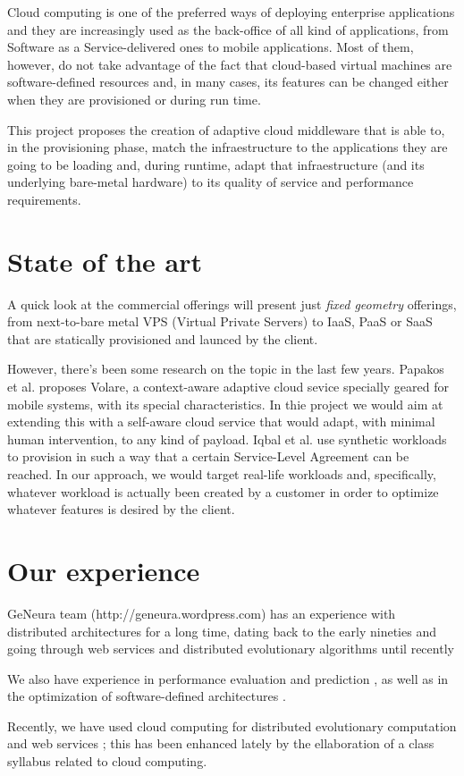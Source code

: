 \documentclass[a4paper]{article}
\begin{document}
Cloud computing is one of the preferred ways of deploying enterprise
applications and they are increasingly used as the back-office of all
kind of applications, from Software as a Service-delivered ones to
mobile applications. Most of them, however, do not take advantage of
the fact that cloud-based virtual machines are software-defined
resources and, in many cases, its features can be changed either when
they are provisioned or during run time.

This project proposes the creation of adaptive cloud middleware that
is able to, in the provisioning phase, match the infraestructure to
the applications they are going to be loading and, during runtime,
adapt that infraestructure (and its underlying bare-metal hardware) to
its quality of service and performance requirements. 

\section{State of the art}

A quick look at the commercial offerings will present just {\em fixed
  geometry} offerings, from next-to-bare metal VPS (Virtual Private
Servers) to IaaS, PaaS or SaaS that are statically provisioned and
launced by the client.

However, there's been some research on the topic in the last few
years. Papakos et al. \cite{Papakos} proposes
Volare, a context-aware adaptive cloud sevice specially geared for
mobile systems, with its special characteristics. In thie project we
would aim at extending this with a self-aware cloud service that would
adapt, with minimal human intervention, to any kind of payload. Iqbal
et al. \cite{Iqbal2011871} use synthetic workloads to provision in
such a way that a certain Service-Level Agreement can be reached. In
our approach, we would target real-life workloads and, specifically,
whatever workload is actually been created by a customer in order to
optimize whatever features is desired by the client.

\section{Our experience}

GeNeura team (http://geneura.wordpress.com) has an experience with
distributed architectures for a long time, dating back to the early
nineties \cite{parallel90} and going through web services and
distributed evolutionary algorithms until recently
\cite{Jini:FEA2000,agajaj,LNCS44480129,Araujo2010}

We also have experience in performance evaluation and prediction
\cite{castillo:evostar08,hardwareevo}, as well as in the optimization of
software-defined architectures \cite{gecco08:castillo}.

Recently, we have used cloud computing for distributed evolutionary
computation \cite{sofea:naco,mericloud} and web services
\cite{DBLP:journals/soco/Garcia-SanchezGCAG13}; this has been enhanced
lately 
by the ellaboration of a class syllabus related to cloud computing. 




\end{document}
